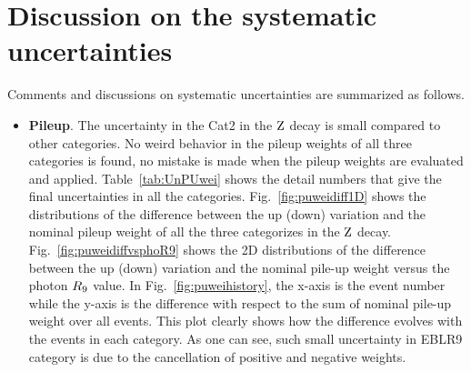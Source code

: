 \chapter{Discussion on the systematic uncertainties}
\label{sec:Appendix_Syst}

	Comments and discussions on systematic uncertainties are summarized as follows.
	
	\begin{itemize}
	\item \textbf{Pileup}. The uncertainty in the Cat2 in the $\mathrm{Z}$ decay is small compared to other categories. No weird behavior in the pileup weights of all three categories is found, no mistake is made when the pileup weights are evaluated and applied. Table~\ref{tab:UnPUwei} shows the detail numbers that give the final uncertainties in all the categories. Fig.~\ref{fig:puweidiff1D} shows the distributions of the difference between the up (down) variation and the nominal pileup weight of all the three categorizes in the $\mathrm{Z}$ decay. Fig.~\ref{fig:puweidiffvsphoR9} shows the 2D distributions of the difference between the up (down) variation and the nominal pile-up weight versus the photon $R_\mathrm{9}$ value. In Fig.~\ref{fig:puweihistory}, the x-axis is the event number while the y-axis is the difference with respect to the sum of nominal pile-up weight over all events. This plot clearly shows how the difference evolves with the events in each category. As one can see, such small uncertainty in EBLR9 category is due to the cancellation of positive and negative weights.  
 \end{itemize}

